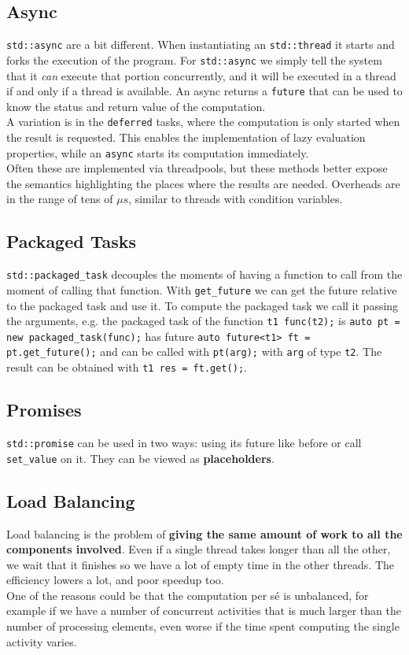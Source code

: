 \documentclass[10pt]{report}
\begin{document}
\subsection{Async}
\texttt{std::async} are a bit different. When instantiating an \texttt{std::thread} it starts and forks the execution of the program. For \texttt{std::async} we simply tell the system that it \textit{can} execute that portion concurrently, and it will be executed in a thread if and only if a thread is available. An async returns a \texttt{future} that can be used to know the status and return value of the computation.\\
A variation is in the \texttt{deferred} tasks, where the computation is only started when the result is requested. This enables the implementation of lazy evaluation properties, while an \texttt{async} starts its computation immediately.\\
Often these are implemented via threadpools, but these methods better expose the semantics highlighting the places where the results are needed. Overheads are in the range of tens of $\mu s$, similar to threads with condition variables.
\subsection{Packaged Tasks}
\texttt{std::packaged\_task} decouples the moments of having a function to call from the moment of calling that function. With \texttt{get\_future} we can get the future relative to the packaged task and use it. To compute the packaged task we call it passing the arguments, e.g. the packaged task of the function \texttt{t1 func(t2);} is \texttt{auto pt = new packaged\_task(func);} has future \texttt{auto future<t1> ft = pt.get\_future();} and can be called with \texttt{pt(arg);} with \texttt{arg} of type \texttt{t2}. The result can be obtained with \texttt{t1 res = ft.get();}.
\subsection{Promises}
\texttt{std::promise} can be used in two ways: using its future like before or call \texttt{set\_value} on it. They can be viewed as \textbf{placeholders}.
\subsection{Load Balancing} Load balancing is the problem of \textbf{giving the same amount of work to all the components involved}. Even if a single thread takes longer than all the other, we wait that it finishes so we have a lot of empty time in the other threads. The efficiency lowers a lot, and poor speedup too.\\
One of the reasons could be that the computation per sé is unbalanced, for example if we have a number of concurrent activities that is much larger than the number of processing elements, even worse if the time spent computing the single activity varies.
\end{document}
